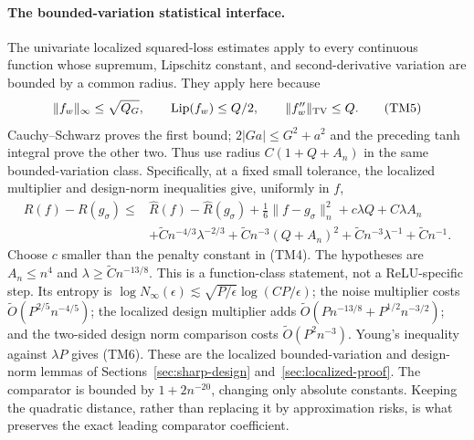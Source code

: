 \paragraph{The bounded-variation statistical interface.}
The univariate localized squared-loss estimates apply to every continuous
function whose supremum, Lipschitz constant, and second-derivative
variation are bounded by a common radius. They apply here because
\[
 \|f_w\|_\infty\le\sqrt{Q_G},\qquad
 \operatorname{Lip}(f_w)\le Q/2,\qquad
 \|f_w''\|_{\rm TV}\le Q.                               \tag{TM5}
\]
Cauchy--Schwarz proves the first bound; $2|Ga|\le G^2+a^2$ and the
preceding tanh integral prove the other two. Thus use radius
$C(1+Q+A_n)$ in the same bounded-variation class.
Specifically, at a fixed small tolerance, the localized multiplier
and design-norm inequalities give, uniformly in $f$,
\begin{align}
 R(f)-R(g_\sigma)\le{}&
 \widehat R(f)-\widehat R(g_\sigma)
 +\tfrac16\|f-g_\sigma\|_n^2+c\lambda Q+C\lambda A_n\nonumber\\
 &+\widetilde Cn^{-4/3}\lambda^{-2/3}
 +\widetilde Cn^{-3}(Q+A_n)^2
 +\widetilde Cn^{-3}\lambda^{-1}+\widetilde Cn^{-1}.       \tag{TM6}
\end{align}
Choose $c$ smaller than the penalty constant in (TM4).
The hypotheses are $A_n\le n^4$ and
$\lambda\ge\widetilde Cn^{-13/8}$.
This is a function-class statement, not a ReLU-specific step.
Its entropy is
$\log N_\infty(\epsilon)\lesssim\sqrt{P/\epsilon}\log(CP/\epsilon)$;
the noise multiplier costs $\widetilde O(P^{2/5}n^{-4/5})$;
the localized design multiplier adds
$\widetilde O(Pn^{-13/8}+P^{1/2}n^{-3/2})$; and the two-sided
design norm comparison costs $\widetilde O(P^2n^{-3})$.
Young's inequality against $\lambda P$ gives (TM6).
These are the localized bounded-variation and design-norm lemmas
of Sections~\ref{sec:sharp-design} and~\ref{sec:localized-proof}. The comparator is bounded by
$1+2n^{-20}$, changing only absolute constants. Keeping the quadratic
distance, rather than replacing it by approximation risks, is what
preserves the exact leading comparator coefficient.

